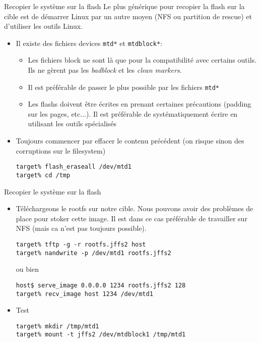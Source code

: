 \begin{frame}[fragile=singleslide]{Recopier le système sur la flash}
  Le  plus  générique pour  recopier  la flash  sur  la  cible est  de
  démarrer Linux par un autre moyen  (NFS ou partition de rescue) et
  d'utiliser les outils Linux.
  \begin{itemize}
  \item    Il   existe   des    fichiers   devices    \verb+mtd*+   et
    \verb+mtdblock*+:
    \begin{itemize}
    \item Les fichiers block ne sont là que pour la compatibilité avec
      certains outils.  Ils ne gèrent  pas les \emph{badblock}  et les
      \emph{clean markers}.
    \item  Il  est préférable  de  passer  le  plus possible  par  les
      fichiers \verb+mtd*+
    \item  Les  flashs  doivent   être  écrites  en  prenant  certaines
      précautions (padding  sur les pages, etc...).  Il est préférable
      de systématiquement écrire en utilisant les outils spécialisés
    \end{itemize}
  \item Toujours commencer par effacer le contenu précédent (on risque
    sinon des corruptions sur le filesystem)
    \begin{lstlisting}
target% flash_eraseall /dev/mtd1
target% cd /tmp
    \end{lstlisting}
  \end{itemize}
\end{frame}

\begin{frame}[fragile=singleslide]{Recopier le système sur la flash}
  \begin{itemize}
  \item Téléchargeons  le rootfs sur  notre cible. Nous  pouvons avoir
    des problèmes  de place pour stoker  cette image.  Il  est dans ce
    cas préférable de  travailler sur NFS (mais ca  n'est pas toujours
    possible).
    \begin{lstlisting}
target% tftp -g -r rootfs.jffs2 host
target% nandwrite -p /dev/mtd1 rootfs.jffs2
    \end{lstlisting}
    ou bien
    \begin{lstlisting}
host$ serve_image 0.0.0.0 1234 rootfs.jffs2 128
target% recv_image host 1234 /dev/mtd1
    \end{lstlisting}
  \item  Test
    \begin{lstlisting}
target% mkdir /tmp/mtd1
target% mount -t jffs2 /dev/mtdblock1 /tmp/mtd1
    \end{lstlisting}
  \end{itemize}
\end{frame}

